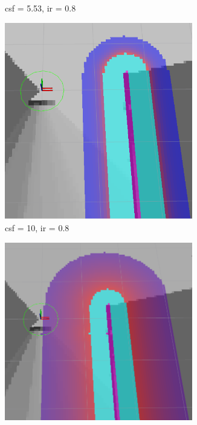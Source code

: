 \documentclass[capstone_report.tex]{subfiles}
\begin{document}
\begin{figure}[H]
\begin{subfigure}{0.33\textwidth}
        \caption{csf = 5.53, ir = 0.8}
    \end{subfigure}
    \begin{subfigure}{0.33\textwidth}
        \centering
        \includegraphics[width=0.9\textwidth]{imgs/lcm/lcm_csf_10_ir_08.png}
        \caption{csf = 10, ir = 0.8}
    \end{subfigure}
        \begin{subfigure}{0.33\textwidth}
        \centering
        \includegraphics[width=0.9\textwidth]{imgs/lcm/lcm_csf_1_ir_15.png}

\end{subfigure}
\end{figure}
\end{document}
